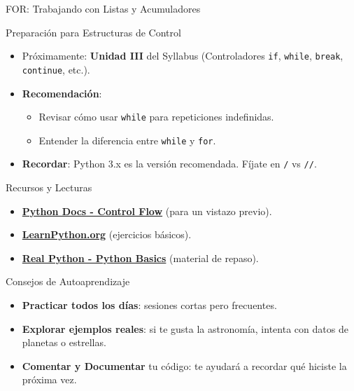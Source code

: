 \documentclass[10pt]{beamer}
\begin{document}
\begin{frame}[fragile]{FOR: Trabajando con Listas y Acumuladores}
\begin{frame}{Preparación para Estructuras de Control}
  \begin{itemize}
    \item Próximamente: \textbf{Unidad III} del Syllabus (Controladores \texttt{if}, \texttt{while}, \texttt{break}, \texttt{continue}, etc.).
    \item \textbf{Recomendación}:
      \begin{itemize}
        \item Revisar cómo usar \texttt{while} para repeticiones indefinidas.
        \item Entender la diferencia entre \texttt{while} y \texttt{for}.
      \end{itemize}
    \item \textbf{Recordar}: Python 3.x es la versión recomendada. Fíjate en \texttt{/} vs \texttt{//}.
  \end{itemize}
\end{frame}

\begin{frame}{Recursos y Lecturas}
  \begin{itemize}
    \item \href{https://docs.python.org/3/tutorial/controlflow.html}{\textbf{Python Docs - Control Flow}} (para un vistazo previo).
    \item \href{https://www.learnpython.org/}{\textbf{LearnPython.org}} (ejercicios básicos).
    \item \href{https://realpython.com/python-basics/}{\textbf{Real Python - Python Basics}} (material de repaso).
  \end{itemize}
\end{frame}

\begin{frame}{Consejos de Autoaprendizaje}
  \begin{itemize}
    \item \textbf{Practicar todos los días}: sesiones cortas pero frecuentes.
    \item \textbf{Explorar ejemplos reales}: si te gusta la astronomía, intenta con datos de planetas o estrellas.
    \item \textbf{Comentar y Documentar} tu código: te ayudará a recordar qué hiciste la próxima vez.
  \end{itemize}
\end{frame}


\end{frame}
\end{document}
